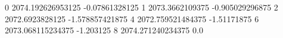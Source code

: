0 2074.192626953125 -0.07861328125
1 2073.3662109375 -0.905029296875
2 2072.6923828125 -1.578857421875
4 2072.759521484375 -1.51171875
6 2073.068115234375 -1.203125
8 2074.271240234375 0.0
